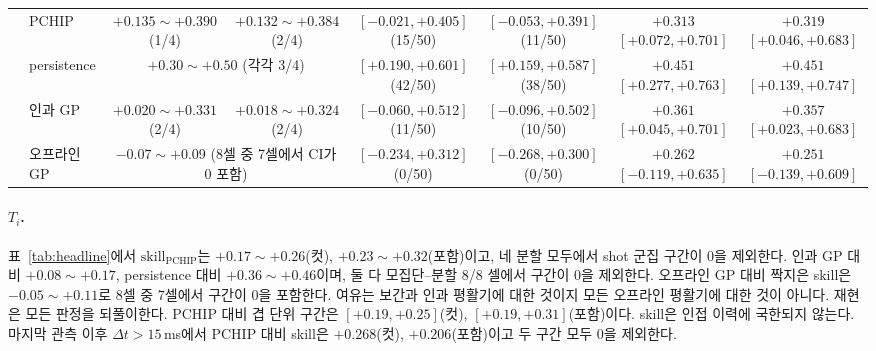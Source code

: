 \documentclass[10pt,twocolumn,letterpaper]{article}
\newcommand{\Ti}{\ensuremath{T_i}}
\newcommand{\skillp}{\ensuremath{\mathrm{skill}_{\mathrm{PCHIP}}}}
\begin{document}
\begin{table}[t]
{\begin{tabular}{llcccccc}
      & PCHIP       & $+0.135\sim+0.390$ (1/4) & $+0.132\sim+0.384$ (2/4) & $[-0.021, +0.405]$ (15/50) & $[-0.053, +0.391]$ (11/50) & $+0.313$ $\mathbf{[+0.072, +0.701]}$ & $+0.319$ $\mathbf{[+0.046, +0.683]}$ \\
      & persistence & \multicolumn{2}{c}{$+0.30\sim+0.50$ (각각 3/4)} & $\mathbf{[+0.190, +0.601]}$ (42/50) & $\mathbf{[+0.159, +0.587]}$ (38/50) & $+0.451$ $\mathbf{[+0.277, +0.763]}$ & $+0.451$ $\mathbf{[+0.139, +0.747]}$ \\
      & 인과 GP     & $+0.020\sim+0.331$ (2/4) & $+0.018\sim+0.324$ (2/4) & $[-0.060, +0.512]$ (11/50) & $[-0.096, +0.502]$ (10/50) & $+0.361$ $\mathbf{[+0.045, +0.701]}$ & $+0.357$ $\mathbf{[+0.023, +0.683]}$ \\
      & 오프라인 GP & \multicolumn{2}{c}{$-0.07\sim+0.09$ (8셀 중 7셀에서 CI가 0 포함)} & $[-0.234, +0.312]$ (0/50) & $[-0.268, +0.300]$ (0/50) & $+0.262$ $[-0.119, +0.635]$ & $+0.251$ $[-0.139, +0.609]$ \\
    \bottomrule
  \end{tabular}}
\end{table}

\paragraph{\Ti{}.} 표~\ref{tab:headline}에서 $\skillp$는 $+0.17\sim+0.26$(컷),
$+0.23\sim+0.32$(포함)이고, 네 분할 모두에서 shot 군집 구간이 0을 제외한다. 인과 GP 대비
$+0.08\sim+0.17$, persistence 대비 $+0.36\sim+0.46$이며, 둘 다 모집단--분할 8/8 셀에서
구간이 0을 제외한다. 오프라인 GP 대비 짝지은 skill은 $-0.05\sim+0.11$로 8셀 중 7셀에서
구간이 0을 포함한다. 여유는 보간과 인과 평활기에 대한 것이지 모든 오프라인 평활기에 대한
것이 아니다. 재현은 모든 판정을 되풀이한다. PCHIP 대비 겹 단위 구간은 $[+0.19, +0.25]$(컷),
$[+0.19, +0.31]$(포함)이다. skill은 인접 이력에 국한되지 않는다. 마지막 관측 이후
$\Delta t > 15$\,ms에서 PCHIP 대비 skill은 $+0.268$(컷), $+0.206$(포함)이고 두 구간 모두
0을 제외한다.
\end{document}
